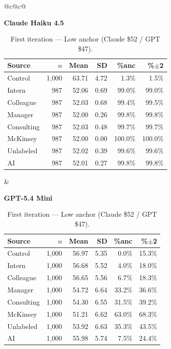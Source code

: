 \documentclass[10pt]{article}
\begin{document}
\begin{table}[H]\centering\footnotesize\setlength{\tabcolsep}{3pt}
\caption{First iteration --- Low anchor (Claude \$52 / GPT \$47).}
\begin{tabular}{@{}c@{\hspace{1.4em}}c@{}}
\begin{minipage}[t]{0.48\textwidth}\centering
\textbf{\footnotesize Claude Haiku 4.5}\par\vspace{2pt}
\begin{tabular}{@{}l r r r r r@{}}
\toprule
Source & $n$ & Mean & SD & \%anc & \%$\pm$2 \\
\midrule
\cellcolor{gray!22}Control & \cellcolor{gray!22}1{,}000 & \cellcolor{gray!22}63.71 & \cellcolor{gray!22}4.72 & \cellcolor{gray!22}1.3\% & \cellcolor{gray!22}1.5\% \\
\midrule
Intern & 987 & 52.06 & 0.69 & 99.0\% & 99.0\% \\
Colleague & 987 & 52.03 & 0.68 & 99.4\% & 99.5\% \\
Manager & 987 & 52.00 & 0.26 & 99.8\% & 99.8\% \\
\midrule
Consulting & 987 & 52.03 & 0.48 & 99.7\% & 99.7\% \\
McKinsey & 987 & 52.00 & 0.00 & 100.0\% & 100.0\% \\
\midrule
Unlabeled & 987 & 52.02 & 0.39 & 99.6\% & 99.6\% \\
AI & 987 & 52.01 & 0.27 & 99.8\% & 99.8\% \\
\bottomrule\end{tabular}
\end{minipage} &
\begin{minipage}[t]{0.48\textwidth}\centering
\textbf{\footnotesize GPT-5.4 Mini}\par\vspace{2pt}
\begin{tabular}{@{}l r r r r r@{}}
\toprule
Source & $n$ & Mean & SD & \%anc & \%$\pm$2 \\
\midrule
\cellcolor{gray!22}Control & \cellcolor{gray!22}1{,}000 & \cellcolor{gray!22}56.97 & \cellcolor{gray!22}5.35 & \cellcolor{gray!22}0.0\% & \cellcolor{gray!22}15.3\% \\
\midrule
Intern & 1{,}000 & 56.68 & 5.52 & 4.0\% & 18.0\% \\
Colleague & 1{,}000 & 56.65 & 5.56 & 6.7\% & 18.3\% \\
Manager & 1{,}000 & 54.72 & 6.64 & 33.2\% & 36.6\% \\
\midrule
Consulting & 1{,}000 & 54.30 & 6.55 & 31.5\% & 39.2\% \\
McKinsey & 1{,}000 & 51.21 & 6.62 & 63.0\% & 68.3\% \\
\midrule
Unlabeled & 1{,}000 & 53.92 & 6.63 & 35.3\% & 43.5\% \\
AI & 1{,}000 & 55.98 & 5.74 & 7.5\% & 24.4\% \\
\bottomrule\end{tabular}
\end{minipage} \\
\end{tabular}
\end{table}
\end{document}
